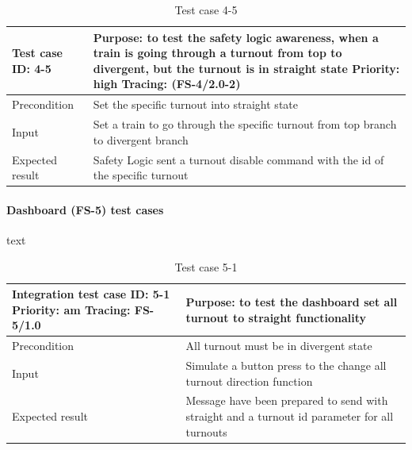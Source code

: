 \begin{table}[H]
	\caption{Test case 4-5}
	\label{table:TCase-FS4-5}
	\begin{center}
		\renewcommand{\arraystretch}{1.8}
		\begin{tabu} 
			to 0.9 \textwidth
			{  X[0.4, c] X[c] }
			\toprule
			Test case ID: 4-5 & Purpose: to test the safety logic awareness, when a train is going through a turnout from top to divergent, but the turnout is in straight state \newline Priority: high \newline Tracing: (FS-4/2.0-2)\\ \midrule
			Precondition & Set the specific turnout into straight state  \\
			Input & Set a train to go through the specific turnout from top branch to divergent branch \\
			Expected result & Safety Logic sent a turnout disable command with the id of the specific turnout \\ \bottomrule
		\end{tabu}
	\end{center}
\end{table} 

\paragraph{Dashboard (FS-5) test cases} text
\begin{table}[H]
	\caption{Test case 5-1}
	\label{table:TCase-FS5-1}
	\begin{center}
		\renewcommand{\arraystretch}{1.8}
		\begin{tabu} 
			to 0.9 \textwidth
			{  X[0.4, c] X[c] }
			\toprule
			Integration test case ID: 5-1 \newline Priority: am \newline Tracing: FS-5/1.0 & Purpose: to test the dashboard set all turnout to straight functionality                     \\ \midrule
			Precondition                                                                   & All turnout must be in divergent state                                                       \\
			Input                                                                          & Simulate a button press to the change all turnout direction function                         \\
			Expected result                                                                & Message have been prepared to send with straight and a turnout id parameter for all turnouts \\ \bottomrule
		\end{tabu}
	\end{center}
\end{table}

